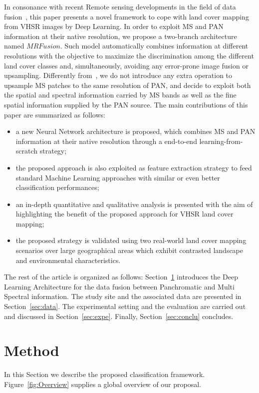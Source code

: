 \documentclass[journal]{IEEEtran}
\newcommand{\method}{$MRFusion$}
\begin{document}
In consonance with recent Remote sensing developments in the field of data fusion~\cite{LiuJZZZLYT18,XuLRDGZ18}, this paper presents a novel framework to cope with land cover mapping from VHSR images by Deep Learning. In order to exploit MS and PAN information at their native resolution, we propose a two-branch architecture named \method{}. Such model automatically combines information at different resolutions with the objective to maximize the discrimination among the different land cover classes and, simultaneously, avoiding any error-prone image fusion or upsampling.
Differently from~\cite{LiuJZZZLYT18}, we do not introduce any extra operation to upsample MS patches to the same resolution of PAN, and decide to exploit both the spatial and spectral information carried by MS bands as well as the fine spatial information supplied by the PAN source.
The main contributions of this paper are summarized as follows:
\begin{itemize}
\item a new Neural Network architecture is proposed, which combines MS and PAN information at their native resolution through a end-to-end learning-from-scratch strategy;
\item the proposed approach is also exploited as feature extraction strategy to feed standard Machine Learning approaches with similar or even better classification performances;
\item an in-depth quantitative and qualitative analysis is presented with the aim of highlighting the benefit of the proposed approach for VHSR land cover mapping;
\item the proposed strategy is validated using two real-world land cover mapping scenarios over large geographical areas which exhibit contrasted landscape and environmental characteristics.
\end{itemize}

The rest of the article is organized as follows: Section~\ref{sec:method} introduces the Deep Learning Architecture for the data fusion between Panchromatic and Multi Spectral information. The study site and the associated data are presented in Section~\ref{sec:data}. The experimental setting and the evaluation are carried out and discussed in Section~\ref{sec:expe}. Finally, Section~\ref{sec:conclu} concludes.


\section{Method}
\label{sec:method}
In this Section we describe the proposed classification framework. Figure~\ref{fig:Overview} supplies a global overview of our proposal.
\end{document}
